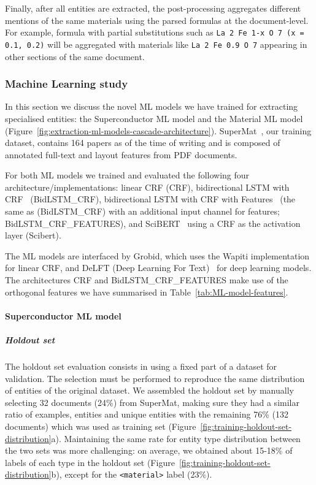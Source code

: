 \documentclass[]{interact}
\theoremstyle{plain}%
\theoremstyle{definition}
\theoremstyle{remark}
\begin{document}
Finally, after all entities are extracted, the post-processing aggregates different mentions of the same materials using the parsed formulas at the document-level.
For example, formula with partial substitutions such as \texttt{La 2 Fe 1-x O 7 (x = 0.1, 0.2)} will be aggregated with materials like \texttt{La 2 Fe 0.9 O 7} appearing in other sections of the same document.

\subsubsection{Machine Learning study}

In this section we discuss the novel ML models we have trained for extracting specialised entities: the Superconductor ML model and the Material ML model (Figure~\ref{fig:extraction-ml-models-cascade-architecture}).
SuperMat~\cite{foppiano2021supermat}, our training dataset, contains 164 papers as of the time of writing and is composed of annotated full-text and layout features from PDF documents.

For both ML models we trained and evaluated the following four architecture/implementations: linear CRF (CRF), bidirectional LSTM with CRF~\cite{Lample2016NeuralAF} (BidLSTM\_CRF), bidirectional LSTM with CRF with Features~\cite{Lample2016NeuralAF} (the same as (BidLSTM\_CRF) with an additional input channel for features; BidLSTM\_CRF\_FEATURES), and SciBERT~\cite{Beltagy2019SciBERT} using a CRF as the activation layer (Scibert).

The ML models are interfaced by Grobid, which uses the Wapiti\cite{lavergne2010practical} implementation for linear CRF, and DeLFT (Deep Learning For Text)~\cite{DeLFT} for deep learning models.
The architectures CRF and BidLSTM\_CRF\_FEATURES make use of the orthogonal features we have summarised in Table~\ref{tab:ML-model-features}.

\paragraph*{Superconductor ML model}

\subparagraph*{Holdout set}
The holdout set evaluation consists in using a fixed part of a dataset for validation. 
The selection must be performed to reproduce the same distribution of entities of the original dataset.
We assembled the holdout set by manually selecting 32 documents (24\%) from SuperMat, making sure they had a similar ratio of examples, entities and unique entities with the remaining 76\% (132 documents) which was used as training set (Figure~\ref{fig:training-holdout-set-distribution}a).
Maintaining the same rate for entity type distribution between the two sets was more challenging: on average, we obtained about 15-18\% of labels of each type in the holdout set (Figure~\ref{fig:training-holdout-set-distribution}b), except for the \texttt{<material>} label (23\%). %
\end{document}
